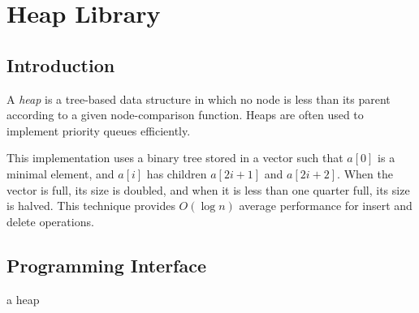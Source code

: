 %
%
%

\chapter {Heap Library}\label{chap:heap}

\section {Introduction}

A \emph{heap} is a tree-based data structure in which no node is less than its
parent according to a given node-comparison function. Heaps are often used to implement
priority queues efficiently.

This implementation uses a binary tree stored in a vector  such that $a[0]$ is a
minimal element, and $a[i]$ has children $a[2i+1]$ and $a[2i+2]$. When the vector is full,
its size is doubled, and when it is less than one quarter full, its size is halved. This
technique provides $O(\log{n})$ average performance for insert and delete operations.

\section {Programming Interface}

\begin{procedure}
\end{procedure}
\returns{} a heap

